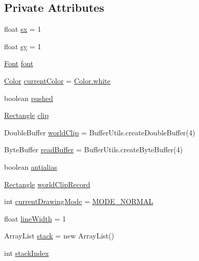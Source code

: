 \subsection*{Private Attributes}
\begin{DoxyCompactItemize}
\item 
float \mbox{\hyperlink{classorg_1_1newdawn_1_1slick_1_1_graphics_a4678c53357b785b1af9ea7a163f65dd1}{sx}} = 1
\item 
float \mbox{\hyperlink{classorg_1_1newdawn_1_1slick_1_1_graphics_a8bf991be4929bf3257a80d0176c472a1}{sy}} = 1
\item 
\mbox{\hyperlink{interfaceorg_1_1newdawn_1_1slick_1_1_font}{Font}} \mbox{\hyperlink{classorg_1_1newdawn_1_1slick_1_1_graphics_a3fc899a622817cc89e2c9f0111243b65}{font}}
\item 
\mbox{\hyperlink{classorg_1_1newdawn_1_1slick_1_1_color}{Color}} \mbox{\hyperlink{classorg_1_1newdawn_1_1slick_1_1_graphics_add4b542e574390a735aad66468135d5a}{current\+Color}} = \mbox{\hyperlink{classorg_1_1newdawn_1_1slick_1_1_color_afcd91cbdd26233d226d734f70dca3d2e}{Color.\+white}}
\item 
boolean \mbox{\hyperlink{classorg_1_1newdawn_1_1slick_1_1_graphics_a41f09c172e96932127afa698a0f81db3}{pushed}}
\item 
\mbox{\hyperlink{classorg_1_1newdawn_1_1slick_1_1geom_1_1_rectangle}{Rectangle}} \mbox{\hyperlink{classorg_1_1newdawn_1_1slick_1_1_graphics_ad6d9618b35d844e23f1a27b45491020a}{clip}}
\item 
Double\+Buffer \mbox{\hyperlink{classorg_1_1newdawn_1_1slick_1_1_graphics_a7831d10e767b65c7583e1b78a354318b}{world\+Clip}} = Buffer\+Utils.\+create\+Double\+Buffer(4)
\item 
Byte\+Buffer \mbox{\hyperlink{classorg_1_1newdawn_1_1slick_1_1_graphics_a99121d30e41f3de68c4bd3f56f6cbf3e}{read\+Buffer}} = Buffer\+Utils.\+create\+Byte\+Buffer(4)
\item 
boolean \mbox{\hyperlink{classorg_1_1newdawn_1_1slick_1_1_graphics_a8ad14a02fea22933d2fc5b737433066a}{antialias}}
\item 
\mbox{\hyperlink{classorg_1_1newdawn_1_1slick_1_1geom_1_1_rectangle}{Rectangle}} \mbox{\hyperlink{classorg_1_1newdawn_1_1slick_1_1_graphics_a3f8e29a8ea45df15fdd48d536fe7cb4d}{world\+Clip\+Record}}
\item 
int \mbox{\hyperlink{classorg_1_1newdawn_1_1slick_1_1_graphics_ac16a9a1c8d01b16444ba0851570d1588}{current\+Drawing\+Mode}} = \mbox{\hyperlink{classorg_1_1newdawn_1_1slick_1_1_graphics_a6c86775094fb5d410585e92692c35599}{M\+O\+D\+E\+\_\+\+N\+O\+R\+M\+AL}}
\item 
float \mbox{\hyperlink{classorg_1_1newdawn_1_1slick_1_1_graphics_a0f3d0e354937edf0872a2e79bc036b60}{line\+Width}} = 1
\item 
Array\+List \mbox{\hyperlink{classorg_1_1newdawn_1_1slick_1_1_graphics_af86e114be4d3a01386d2f0dfa815cc20}{stack}} = new Array\+List()
\item 
int \mbox{\hyperlink{classorg_1_1newdawn_1_1slick_1_1_graphics_a4049b6b7ef4980f4a8168172d76f2a12}{stack\+Index}}
\end{DoxyCompactItemize}
